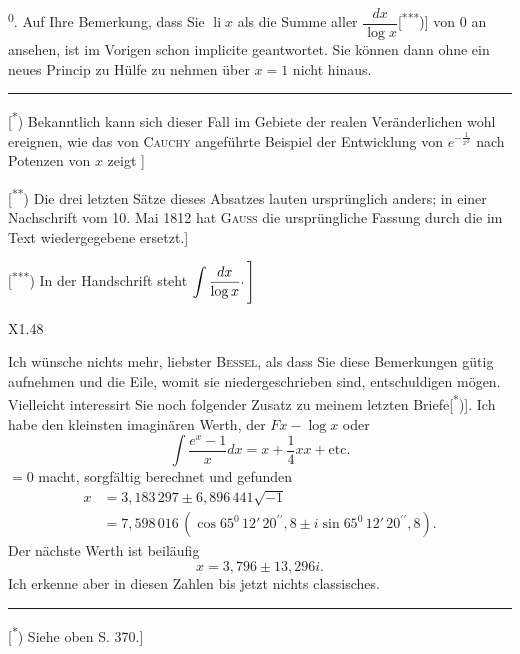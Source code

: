 \textsuperscript{0}. Auf Ihre Bemerkung, dass Sie $\operatorname{li}x$ als die Summe aller $\dfrac{dx}{\log x}$[\textsuperscript{***})] von 0 an ansehen, ist im Vorigen schon implicite geantwortet. Sie können dann ohne ein neues Princip zu Hülfe zu nehmen über $x=1$ nicht hinaus.
\par\medskip\noindent\rule{.24\linewidth}{.4pt}\par\smallskip
{\small
\noindent\hspace*{\parindent}[\textsuperscript{*}) Bekanntlich kann sich dieser Fall im Gebiete der realen Veränderlichen wohl ereignen, wie das von \textsc{Cauchy} angeführte Beispiel der Entwicklung von $e^{-\frac{1}{x^2}}$ nach Potenzen von $x$ zeigt ]
\par\noindent\hspace*{\parindent}[\textsuperscript{**}) Die drei letzten Sätze dieses Absatzes lauten ursprünglich anders; in einer Nachschrift vom 10. Mai 1812 hat \textsc{Gauss} die ursprüngliche Fassung durch die im Text wiedergegebene ersetzt.]
\par\noindent\hspace*{\parindent}$\Biggl[$\textsuperscript{***}) In der Handschrift steht $\displaystyle\int\frac{dx}{\log x}\mathpunct{\raisebox{.35ex}{.}}\Biggr]$
\par}
\noindent X1.\hfill48\par
\clearpage{}
\noindent\hspace*{\parindent}Ich wünsche nichts mehr, liebster \textsc{Bessel}, als dass Sie diese Bemerkungen gütig aufnehmen und die Eile, womit sie niedergeschrieben sind, entschuldigen mögen. Vielleicht interessirt Sie noch folgender Zusatz zu meinem letzten Briefe[\textsuperscript{*})]. Ich habe den kleinsten imaginären Werth, der $Fx-\log x$ oder
\[
\int\frac{e^x-1}{x}dx=x+\frac{1}{4}xx+\text{etc.}
\]
\noindent $=0$ macht, sorgfältig berechnet und gefunden
\[
\begin{aligned}
x&=3{,}183\,297\pm6{,}896\,441\surd{-1}\\
&=7{,}598\,016\,(\cos65^{0}\,12'\,20^{\prime\prime}{,}8\pm i\sin65^{0}\,12'\,20^{\prime\prime}{,}8).
\end{aligned}
\]
\noindent Der nächste Werth ist beiläufig
\[
x=3{,}796\pm13{,}296i.
\]
\noindent Ich erkenne aber in diesen Zahlen bis jetzt nichts classisches.
\par{}
\par\medskip\noindent\rule{.24\linewidth}{.4pt}\par\smallskip
{\small
\noindent\hspace*{\parindent}[\textsuperscript{*}) Siehe oben S. 370.]
\par}

